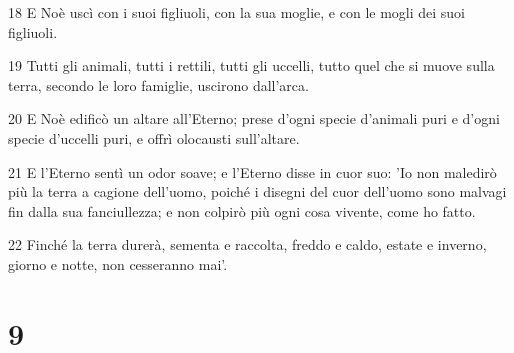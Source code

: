 \par 18 E Noè uscì con i suoi figliuoli, con la sua moglie, e con le mogli dei suoi figliuoli.
\par 19 Tutti gli animali, tutti i rettili, tutti gli uccelli, tutto quel che si muove sulla terra, secondo le loro famiglie, uscirono dall'arca.
\par 20 E Noè edificò un altare all'Eterno; prese d'ogni specie d'animali puri e d'ogni specie d'uccelli puri, e offrì olocausti sull'altare.
\par 21 E l'Eterno sentì un odor soave; e l'Eterno disse in cuor suo: 'Io non maledirò più la terra a cagione dell'uomo, poiché i disegni del cuor dell'uomo sono malvagi fin dalla sua fanciullezza; e non colpirò più ogni cosa vivente, come ho fatto.
\par 22 Finché la terra durerà, sementa e raccolta, freddo e caldo, estate e inverno, giorno e notte, non cesseranno mai'.

\chapter{9}

